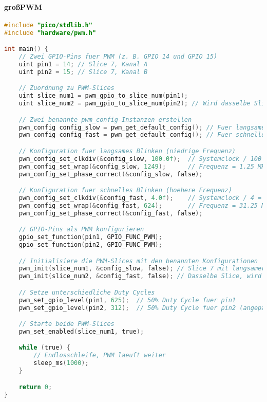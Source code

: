 \documentclass[a4paper,12pt,twoside]{article}
\begin{document}
		\paragraph{großPWM}
\begin{center}
	\begin{minipage}{1.0\textwidth}
		\begin{lstlisting}[language=C]
    #include "pico/stdlib.h"
#include "hardware/pwm.h"

int main() {
    // Zwei GPIO-Pins fuer PWM (z. B. GPIO 14 und GPIO 15)
    uint pin1 = 14; // Slice 7, Kanal A
    uint pin2 = 15; // Slice 7, Kanal B

    // Zuordnung zu PWM-Slices
    uint slice_num1 = pwm_gpio_to_slice_num(pin1);
    uint slice_num2 = pwm_gpio_to_slice_num(pin2); // Wird dasselbe Slice sein, da 14 und 15 zu Slice 7 gehoeren

    // Zwei benannte pwm_config-Instanzen erstellen
    pwm_config config_slow = pwm_get_default_config(); // Fuer langsames Blinken
    pwm_config config_fast = pwm_get_default_config(); // Fuer schnelles Blinken

    // Konfiguration fuer langsames Blinken (niedrige Frequenz)
    pwm_config_set_clkdiv(&config_slow, 100.0f);  // Systemclock / 100 = 1.25 MHz
    pwm_config_set_wrap(&config_slow, 1249);      // Frequenz = 1.25 MHz / 1250 = 1 kHz
    pwm_config_set_phase_correct(&config_slow, false);

    // Konfiguration fuer schnelles Blinken (hoehere Frequenz)
    pwm_config_set_clkdiv(&config_fast, 4.0f);    // Systemclock / 4 = 31.25 MHz
    pwm_config_set_wrap(&config_fast, 624);       // Frequenz = 31.25 MHz / 625 = 50 kHz
    pwm_config_set_phase_correct(&config_fast, false);

    // GPIO-Pins als PWM konfigurieren
    gpio_set_function(pin1, GPIO_FUNC_PWM);
    gpio_set_function(pin2, GPIO_FUNC_PWM);

    // Initialisiere die PWM-Slices mit den benannten Konfigurationen
    pwm_init(slice_num1, &config_slow, false); // Slice 7 mit langsamer Konfig
    pwm_init(slice_num2, &config_fast, false); // Dasselbe Slice, wird ueberschrieben (siehe Hinweis unten)

    // Setze unterschiedliche Duty Cycles
    pwm_set_gpio_level(pin1, 625);  // 50% Duty Cycle fuer pin1
    pwm_set_gpio_level(pin2, 312);  // 50% Duty Cycle fuer pin2 (angepasst an Wrap-Wert von config_fast)

    // Starte beide PWM-Slices
    pwm_set_enabled(slice_num1, true);

    while (true) {
        // Endlosschleife, PWM laeuft weiter
        sleep_ms(1000);
    }

    return 0;
}
    \end{lstlisting}
	\end{minipage}
\end{center}
\end{document}
